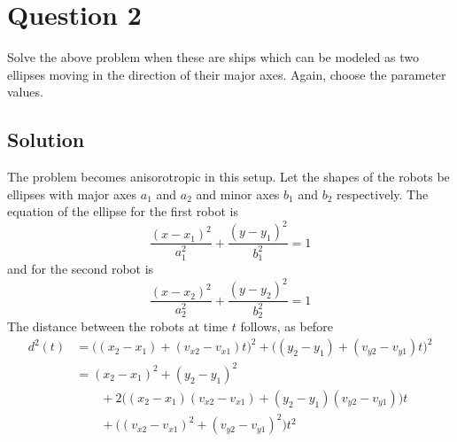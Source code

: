 \section*{Question 2}

Solve the above problem when these are ships which can be modeled as two ellipses moving in
the direction of their major axes.
Again, choose the parameter values.

\subsection*{Solution}

The problem becomes anisorotropic in this setup.
Let the shapes of the robots be ellipses with major axes \( a_1 \) and \( a_2 \) and minor axes \( b_1 \) and \( b_2 \) respectively.
The equation of the ellipse for the first robot is
\begin{equation*}
    \frac{(x - x_1)^2}{a_1^2} + \frac{(y - y_1)^2}{b_1^2} = 1
\end{equation*}
and for the second robot is
\begin{equation*}
    \frac{(x - x_2)^2}{a_2^2} + \frac{(y - y_2)^2}{b_2^2} = 1
\end{equation*}
The distance between the robots at time \( t \) follows, as before
\begin{align*}
    d^2(t)
     & =
    \big((x_2 - x_1) + (v_{x2} - v_{x1})t\big)^2 + \big((y_2 - y_1) + (v_{y2} - v_{y1})t\big)^2
    \\ & =
    (x_2 - x_1)^2 + (y_2 - y_1)^2
    \\ & \qquad
    + 2\big((x_2 - x_1)(v_{x2} - v_{x1}) + (y_2 - y_1)(v_{y2} - v_{y1})\big)t
    \\ & \qquad
    + \big((v_{x2} - v_{x1})^2 + (v_{y2} - v_{y1})^2\big)t^2
\end{align*}
